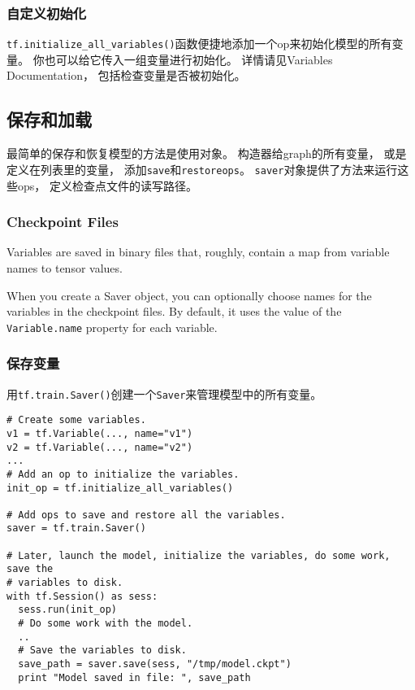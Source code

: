 {\subsubsection{自定义初始化}

\lstinline{tf.initialize_all_variables()}函数便捷地添加一个op来初始化模型的所有变量。  你也可以给它传入一组变量进行初始化。  详情请见Variables Documentation， 包括检查变量是否被初始化。

\subsection {保存和加载}
最简单的保存和恢复模型的方法是使用对象。  构造器给graph的所有变量， 或是定义在列表里的变量， 添加\lstinline{save}和\lstinline{restoreops}。  \lstinline{saver}对象提供了方法来运行这些ops， 定义检查点文件的读写路径。

\subsubsection{Checkpoint Files}
Variables are saved in binary files that, roughly, contain a map from variable names to tensor values.

When you create a Saver object, you can optionally choose names for the variables in the checkpoint files. By default, it uses the value of the \lstinline{Variable.name} property for each variable.

\subsubsection{保存变量}

用\lstinline{tf.train.Saver()}创建一个\lstinline{Saver}来管理模型中的所有变量。

\begin{lstlisting}
# Create some variables.
v1 = tf.Variable(..., name="v1")
v2 = tf.Variable(..., name="v2")
...
# Add an op to initialize the variables.
init_op = tf.initialize_all_variables()

# Add ops to save and restore all the variables.
saver = tf.train.Saver()

# Later, launch the model, initialize the variables, do some work, save the
# variables to disk.
with tf.Session() as sess:
  sess.run(init_op)
  # Do some work with the model.
  ..
  # Save the variables to disk.
  save_path = saver.save(sess, "/tmp/model.ckpt")
  print "Model saved in file: ", save_path
\end{lstlisting}

}

